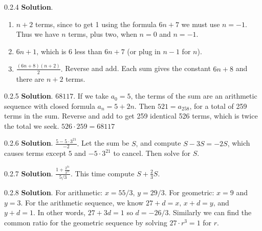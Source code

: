 \documentclass[11pt,]{book}
\theoremstyle{ptxplainnotitle}
\theoremstyle{ptxplaintitle}
\theoremstyle{ptxdefinitionnotitle}
\theoremstyle{ptxdefinitiontitle}
\theoremstyle{ptxdefinitionnotitle}
\theoremstyle{ptxdefinitiontitle}
\theoremstyle{ptxdefinitionnotitle}
\theoremstyle{ptxdefinitiontitle}
\theoremstyle{ptxdefinitiontitlenonumber}
\theoremstyle{ptxdefinitiontitlenonumber}
\numberwithin{equation}{chapter}
\begin{document}
\begin{divisionexercise}{0.2.4}
\textbf{Solution}.\quad%
\hypertarget{p-290}{}%
\leavevmode%
\begin{enumerate}[label=\alph*.]
\item\hypertarget{li-168}{}\hypertarget{p-291}{}%
\(n+2\) terms, since to get 1 using the formula \(6n+7\) we must use \(n=-1\text{.}\)  Thus we have \(n\) terms, plus two, when \(n=0\) and \(n=-1\text{.}\)%
\item\hypertarget{li-169}{}\hypertarget{p-292}{}%
\(6n+1\text{,}\) which is 6 less than \(6n+7\) (or plug in \(n-1\) for \(n\)).%
\item\hypertarget{li-170}{}\hypertarget{p-293}{}%
\(\frac{(6n+8)(n+2)}{2}\text{.}\)  Reverse and add.  Each sum gives the constant \(6n+8\) and there are \(n+2\) terms.%
\end{enumerate}
%
\end{divisionexercise}%
\begin{divisionexercise}{0.2.5}
\textbf{Solution}.\quad%
\hypertarget{p-299}{}%
\(68117\text{.}\)  If we take \(a_0 = 5\text{,}\) the terms of the sum are an arithmetic sequence with closed formula \(a_n = 5+2n\text{.}\)  Then \(521 = a_{258}\text{,}\) for a total of 259 terms in the sum.  Reverse and add to get 259 identical 526 terms, which is twice the total we seek.  \(526\cdot 259 = 68117\)%
\end{divisionexercise}%
\begin{divisionexercise}{0.2.6}
\textbf{Solution}.\quad%
\hypertarget{p-305}{}%
\(\frac{5-5\cdot 3^{21}}{-2}\text{.}\)  Let the sum be \(S\text{,}\) and compute \(S - 3S = -2S\text{,}\) which causes terms except \(5\) and \(-5\cdot 3^{21}\) to cancel.  Then solve for \(S\text{.}\)%
\end{divisionexercise}%
\begin{divisionexercise}{0.2.7}
\textbf{Solution}.\quad%
\hypertarget{p-311}{}%
\(\frac{1 + \frac{2^{31}}{3^{31}}}{5/3}\text{.}\)  This time compute \(S + \frac{2}{3}S\text{.}\)%
\end{divisionexercise}%
\begin{divisionexercise}{0.2.8}
\textbf{Solution}.\quad%
\hypertarget{p-319}{}%
For arithmetic: \(x = 55/3\text{,}\) \(y = 29/3\text{.}\) For geometric: \(x = 9\) and \(y = 3\text{.}\)  For the arithmetic sequence, we know \(27 + d = x\text{,}\) \(x + d = y\text{,}\) and \(y + d = 1\text{.}\)  In other words, \(27 + 3d = 1\) so \(d = -26/3\text{.}\)  Similarly we can find the common ratio for the geometric sequence by solving \(27\cdot r^3 = 1\) for \(r\text{.}\)%
\end{divisionexercise}%
\end{document}
